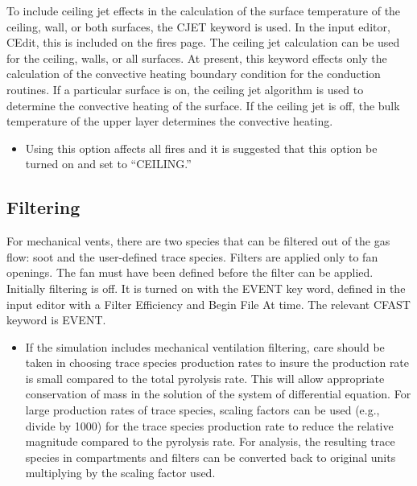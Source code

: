  To include ceiling jet effects in the calculation of the surface temperature of the ceiling, wall, or both surfaces, the CJET keyword is used.  In the input editor, CEdit, this is included on the fires page. The ceiling jet calculation can be used for the ceiling, walls, or all surfaces. At present, this keyword effects only the calculation of the convective heating boundary condition for the conduction routines.  If a particular surface is on, the ceiling jet algorithm is used to determine the convective heating of the surface.  If the ceiling jet is off, the bulk temperature of the upper layer determines the convective heating.

\begin{itemize}
\item Using this option affects all fires and it is suggested that this option be turned on and set to “CEILING.”
\end{itemize}

\subsection{Filtering}
 
For mechanical vents, there are two species that can be filtered out of the gas flow: soot and the user-defined trace species. Filters are applied only to fan openings. The fan must have been defined before the filter can be applied. Initially filtering is off. It is turned on with the EVENT key word, defined in the input editor with a Filter Efficiency and Begin File At time. The relevant CFAST keyword is EVENT.

\begin{itemize}
\item If the simulation includes mechanical ventilation filtering, care should be taken in choosing trace species production rates to insure the production rate is small compared to the total pyrolysis rate.  This will allow appropriate conservation of mass in the solution of the system of differential equation.  For large production rates of trace species, scaling factors can be used (e.g., divide by 1000) for the trace species production rate to reduce the relative magnitude compared to the pyrolysis rate.  For analysis, the resulting trace species in compartments and filters can be converted back to original units multiplying by the scaling factor used.
\end{itemize}